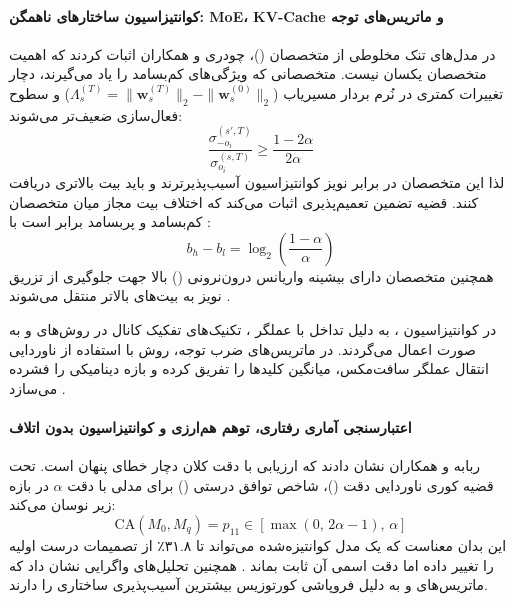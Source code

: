 \paragraph*{کوانتیزاسیون ساختارهای ناهمگن: MoE، KV-Cache و ماتریس‌های توجه}
در مدل‌های تنک مخلوطی از متخصصان ()، چودری و همکاران \cite{chowdhury2026efficient} اثبات کردند که اهمیت متخصصان یکسان نیست. متخصصانی که ویژگی‌های کم‌بسامد را یاد می‌گیرند، دچار تغییرات کمتری در نُرم بردار مسیریاب ($\Lambda_s^{(T)} = \|\mathbf{w}_s^{(T)}\|_2 - \|\mathbf{w}_s^{(0)}\|_2$) و سطوح فعال‌سازی ضعیف‌تر می‌شوند:
\begin{equation}
    \frac{\sigma_{-o_i}^{(s', T)}}{\sigma_{o_i}^{(s, T)}} \ge \frac{1 - 2\alpha}{2\alpha}
\end{equation}
لذا این متخصصان در برابر نویز کوانتیزاسیون آسیب‌پذیرترند و باید بیت بالاتری دریافت کنند. قضیه تضمین تعمیم‌پذیری اثبات می‌کند که اختلاف بیت مجاز میان متخصصان کم‌بسامد و پربسامد برابر است با \cite{chowdhury2026efficient}:
\begin{equation}
    b_h - b_l = \log_2\left(\frac{1 - \alpha}{\alpha}\right)
\end{equation}
همچنین متخصصان دارای بیشینه واریانس درون‌نرونی () بالا جهت جلوگیری از تزریق نویز به بیت‌های بالاتر منتقل می‌شوند \cite{chowdhury2026efficient}.

در کوانتیزاسیون ، به دلیل تداخل با عملگر ، تکنیک‌های تفکیک کانال در روش‌های  و  \cite{hooper2024kvquant} به صورت  اعمال می‌گردند. در ماتریس‌های ضرب توجه، روش  \cite{zhang2025sageattention} با استفاده از ناوردایی انتقال عملگر سافت‌مکس، میانگین کلیدها را تفریق کرده و بازه دینامیکی را فشرده می‌سازد \cite{zhang2025sageattention}.

\paragraph*{اعتبارسنجی آماری رفتاری، توهم هم‌ارزی و کوانتیزاسیون بدون اتلاف}
ربابه و همکاران \cite{rababah2026illusion} نشان دادند که ارزیابی با دقت کلان دچار خطای پنهان است. تحت قضیه کوری ناوردایی دقت ()، شاخص توافق درستی () برای مدلی با دقت $\alpha$ در بازه زیر نوسان می‌کند:
\begin{equation}
    \mathrm{CA}(M_0, M_q) = p_{11} \in [\max(0, \, 2\alpha - 1), \, \alpha]
\end{equation}
این بدان معناست که یک مدل کوانتیزه‌شده می‌تواند تا ۳۱.۸٪ از تصمیمات درست اولیه را تغییر داده اما دقت اسمی آن ثابت بماند \cite{rababah2026illusion}. همچنین تحلیل‌های واگرایی نشان داد که ماتریس‌های  و  به دلیل فروپاشی کورتوزیس بیشترین آسیب‌پذیری ساختاری را دارند.

